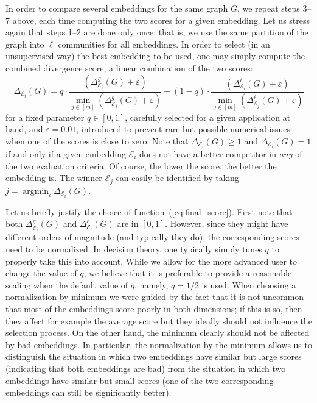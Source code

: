 \documentclass[11pt]{article}
\newcommand{\eps}{\varepsilon}
\newcommand{\emb}{\mathcal E}
\DeclareMathOperator*{\argmin}{argmin}
\begin{document}
In order to compare several embeddings for the same graph $G$, we repeat steps 3--7 above, each time computing the two scores for a given embedding. Let us stress again that steps 1--2 are done only once; that is, we use the same partition of the graph into $\ell$ communities for all embeddings. In order to select (in an unsupervised way) the best embedding to be used, one may simply compute the combined divergence score, a linear combination of the two scores:
\begin{equation}
\Delta_{\emb_i}(G) = q \cdot \frac { (\Delta^{g}_{\emb_i}(G) + \eps) } { \min_{j \in [m]} ( \Delta^{g}_{\emb_j}(G) + \eps) } + (1-q) \cdot \frac { (\Delta^{\ell}_{\emb_i}(G) + \eps) } {\min_{j \in [m]} ( \Delta^{\ell}_{\emb_j}(G) + \eps) }
\label{eq:final_score}
\end{equation}
for a fixed parameter $q \in [0,1]$, carefully selected for a given application at hand, and $\eps=0.01$, introduced to prevent rare but possible numerical issues when one of the scores is close to zero. Note that $\Delta_{\emb_i}(G) \ge 1$ and $\Delta_{\emb_i}(G) = 1$ if and only if a given embedding $\emb_i$ does not have a better competitor in \emph{any} of the two evaluation criteria. Of course, the lower the score, the better the embedding is. The winner $\emb_j$ can easily be identified by taking $j = \argmin_i \Delta_{\emb_i}(G)$.

Let us briefly justify the choice of function~(\ref{eq:final_score}). First note that both $\Delta^{g}_{\emb_i}(G)$ and $\Delta^{\ell}_{\emb_i}(G)$ are in $[0,1]$. However, since they might have different orders of magnitude (and typically they do), the corresponding scores need to be normalized. In decision theory, one typically simply tunes $q$ to properly take this into account. While we allow for the more advanced user to change the value of $q$, we believe that it is preferable to provide a reasonable scaling when the default value of $q$, namely, $q=1/2$ is used. When choosing a normalization by minimum we were guided by the fact that it is not uncommon that most of the embeddings score poorly in both dimensions; if this is so, then they affect for example the average score but they ideally should not influence the selection process. On the other hand, the minimum clearly should not be affected by bad embeddings. In particular, the normalization by the minimum allows us to distinguish the situation in which two embeddings have similar but large scores (indicating that both embeddings are bad) from the situation in which two embeddings have similar but small scores (one of the two corresponding embeddings can still be significantly better).
\end{document}
